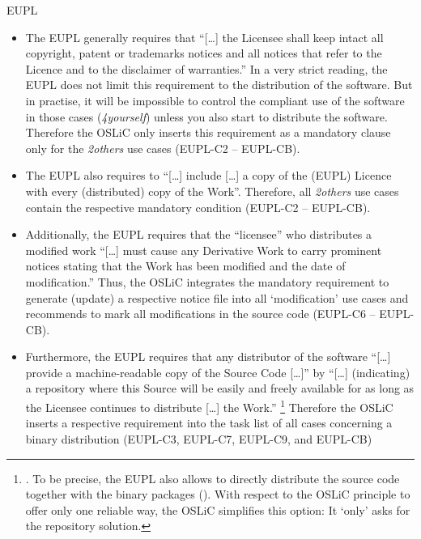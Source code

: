 \begin{license}{EUPL}
\begin{itemize}
\item The EUPL generally requires that \enquote{[\ldots] the Licensee shall
  keep intact all copyright, patent or trademarks notices and all notices that
  refer to the Licence and to the disclaimer of warranties.} 
  In a very strict reading, the EUPL does not limit this requirement to the
  distribution of the software. But in practise, it will be impossible to
  control the compliant use of the software in those cases (\emph{4yourself})
  unless you also start to distribute the software. Therefore the OSLiC only
  inserts this requirement as a mandatory clause only for the \emph{2others} use 
  cases (EUPL-C2 -- EUPL-CB). 
  
\item The EUPL also requires to \enquote{[\ldots] include [\ldots] a copy of
  the (EUPL) Licence with every (distributed) copy of the Work}.
  Therefore, all \emph{2others} use cases contain the respective mandatory
  condition (EUPL-C2 -- EUPL-CB).
  
\item Additionally, the EUPL requires that the \enquote{licensee} who
  distributes a modified work \enquote{[\ldots] must cause any Derivative Work 
  to carry prominent notices stating that the Work has been modified and the
  date of modification.} 
  Thus, the OSLiC integrates the mandatory requirement to generate (update) a
  respective notice file into all `modification' use cases and recommends to mark
  all modifications in the source code (EUPL-C6 -- EUPL-CB).
  
\item Furthermore, the EUPL requires that any distributor of the software
  \enquote{[\ldots] provide a machine-readable copy of the Source Code [\ldots]}
  by \enquote{[\ldots] (indicating) a repository where this Source will be
  easily and freely available for as long as the Licensee continues to
  distribute [\ldots] the Work.}%
  \footnote{\cite[cf.][\nopage wp.\ §5]{EuplLicense2007en}. To be precise, the
    EUPL also allows to directly distribute the source code together with the
    binary packages (\cite[cf.][\nopage wp.\ §3]{EuplLicense2007en}). With
    respect to the OSLiC principle to offer only one reliable way, the OSLiC
    simplifies this option: It `only' asks for the repository solution.} 
  Therefore the OSLiC inserts a respective requirement into the task list of all
  cases concerning a binary distribution (EUPL-C3, EUPL-C7, EUPL-C9, and EUPL-CB)
  

\end{itemize}
\end{license}
